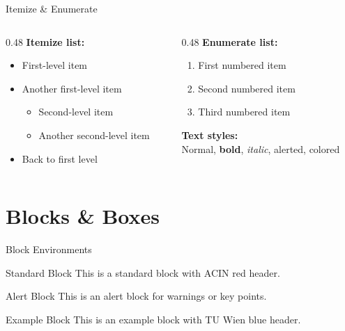 \documentclass[aspectratio=169]{beamer}
\begin{document}
\begin{frame}{Itemize \& Enumerate}
  \begin{columns}[T]
    \begin{column}{0.48\textwidth}
      \textbf{Itemize list:}
      \begin{itemize}
        \item First-level item
        \item Another first-level item
          \begin{itemize}
            \item Second-level item
            \item Another second-level item
          \end{itemize}
        \item Back to first level
      \end{itemize}
    \end{column}
    \begin{column}{0.48\textwidth}
      \textbf{Enumerate list:}
      \begin{enumerate}
        \item First numbered item
        \item Second numbered item
        \item Third numbered item
      \end{enumerate}

      \vspace{4mm}
      \textbf{Text styles:}\\
      Normal, \textbf{bold}, \textit{italic}, \alert{alerted}, {\color{TUblue}colored}
    \end{column}
  \end{columns}
\end{frame}

\section{Blocks \& Boxes}

\begin{frame}{Block Environments}
  \begin{block}{Standard Block}
    This is a standard block with ACIN red header.
  \end{block}

  \begin{alertblock}{Alert Block}
    This is an alert block for warnings or key points.
  \end{alertblock}

  \begin{exampleblock}{Example Block}
    This is an example block with TU Wien blue header.
  \end{exampleblock}
\end{frame}
\end{document}
